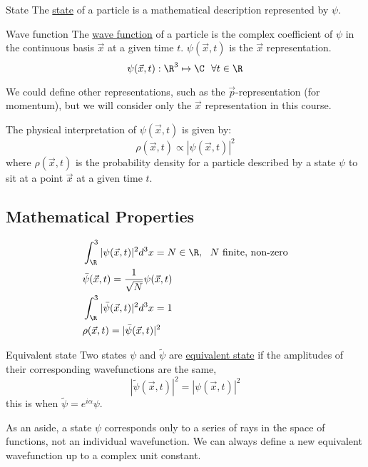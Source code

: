 \documentclass[../Main.tex]{subfiles}
\begin{document}
\begin{definition}{State}
    The \underline{state} of a particle is a mathematical description represented by $\psi$.
\end{definition}
\begin{definition}{Wave function}
    The \underline{wave function} of a particle is the complex coefficient of $\psi$ in the continuous basis $\vec{x}$ at a given time $t$. $\psi(\vec{x}, t)$ is the $\vec{x}$ representation.
    \begin{equation*}
        \psi(\vec{x}, t) : \R^3 \mapsto \C~~\forall t \in \R
    \end{equation*}
\end{definition}
\begin{remark}
    We could define other representations, such as the $\vec{p}$-representation (for momentum), but we will consider only the $\vec{x}$ representation in this course.
\end{remark}
The physical interpretation of $\psi(\vec{x}, t)$ is given by:
\begin{equation}
    \rho(\vec{x}, t) \propto |\psi(\vec{x}, t)|^2
    \label{eqnProbAmplitude}
\end{equation}
where $\rho(\vec{x}, t)$ is the probability density for a particle described by a state $\psi$ to sit at a point $\vec{x}$ at a given time $t$.

\subsection{Mathematical Properties}
\begin{align}
    &\int_\R^3 |\psi(\vec{x}, t)|^2 d^3 x = N \in \R,~~N \text{ finite, non-zero} \label{eqnWFTotIntegral} \\
    &\ybar(\vec{x}, t) = \frac{1}{\sqrt{N}} \psi(\vec{x}, t) \label{eqnPhiBar} \\
    &\int_\R^3 |\ybar(\vec{x}, t)|^2 d^3 x = 1 \label{eqnWFInt1} \\
    &\rho(\vec{x}, t) = |\ybar(\vec{x}, t)|^2 \label{eqnWFProbDens}
\end{align}
\begin{definition}{Equivalent state}
    Two states $\psi$ and $\tilde{\psi}$ are \underline{equivalent state} if the amplitudes of their corresponding wavefunctions are the same,
    \begin{equation*}
        |\tilde{\psi}(\vec{x}, t)|^2 = |\psi(\vec{x}, t)|^2
    \end{equation*}
    this is when $\tilde{\psi} = e^{i\alpha} \psi$.
\end{definition}
\begin{remark}
    As an aside, a state $\psi$ corresponds only to a series of rays in the space of functions, not an individual wavefunction. We can always define a new equivalent wavefunction up to a complex unit constant.
\end{remark}
\end{document}
